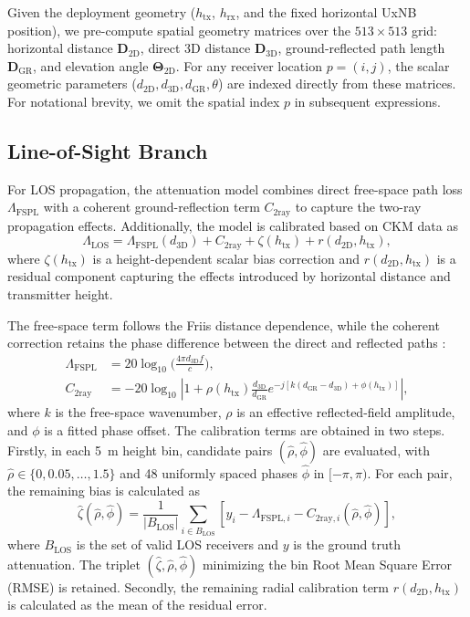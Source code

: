 \documentclass[10pt,conference,letterpaper]{IEEEtran}
\begin{document}
Given the deployment geometry ($h_{\text{tx}}$, $h_{\text{rx}}$, and the fixed horizontal UxNB position), we pre-compute spatial geometry matrices over the $513 \times 513$ grid: horizontal distance $\mathbf{D}_{\text{2D}}$, direct 3D distance $\mathbf{D}_{\text{3D}}$, ground-reflected path length $\mathbf{D}_{\text{GR}}$, and elevation angle $\mathbf{\Theta}_{\text{2D}}$. For any receiver location $p = (i, j)$, the scalar geometric parameters ($d_{\text{2D}}, d_{\text{3D}}, d_{\text{GR}}, \theta$) are indexed directly from these matrices. For notational brevity, we omit the spatial index $p$ in subsequent expressions.

\subsection{Line-of-Sight Branch}
\label{sec:los}
For LOS propagation, the attenuation model combines direct free-space path loss $\Lambda_\text{FSPL}$ with a coherent ground-reflection term $C_{\text{2ray}}$ to capture the two-ray propagation effects. Additionally, the model is calibrated based on CKM data as
\begin{equation}
\Lambda_{\text{LOS}} = \Lambda_\text{FSPL}(d_{\text{3D}}) + C_{\text{2ray}} + \zeta(h_{\text{tx}}) + r(d_{\text{2D}},h_{\text{tx}}),
\label{eq:pl_los}
\end{equation}
where $\zeta(h_{\text{tx}})$ is a height-dependent scalar bias correction and $r(d_{\text{2D}},h_{\text{tx}})$ is a residual component capturing the effects introduced by horizontal distance and transmitter height.

The free-space term follows the Friis distance dependence, while the coherent
correction retains the phase difference between the direct and reflected paths
\cite{rappaport}:
\begin{align}
\Lambda_\text{FSPL}&=20\log_{10}\Big(\frac{4\pi d_\text{3D} f}{c}\Big),\label{eq:fspl}\\
C_{\mathrm{2ray}}&=-20\log_{10}\left|1+\rho(h_{\mathrm{tx}})
\frac{d_{\mathrm{3D}}}{d_{\mathrm{GR}}}
e^{-j[k(d_{\mathrm{GR}}-d_{\mathrm{3D}})+\phi(h_{\mathrm{tx}})]}\right|,
\label{eq:tworay}
\end{align}
where $k$ is the free-space wavenumber, $\rho$ is an effective reflected-field amplitude, and $\phi$ is a fitted phase offset. The calibration terms are obtained in two steps.
Firstly, in each \SI{5}{m} height bin, candidate pairs $(\hat\rho,\hat\phi)$ are evaluated, with $\hat\rho\in\{0,0.05,\ldots,1.5\}$ and 48 uniformly spaced phases $\hat{\phi}$ in $[-\pi,\pi)$. For each pair, the remaining bias is calculated as
\begin{equation}
\hat\zeta(\hat\rho,\hat\phi)=\frac{1}{|B_\text{LOS}|}\sum_{i\in B_\text{LOS}}
\left[y_i-\Lambda_{\text{FSPL},i}-C_{\mathrm{2ray},i}(\hat\rho,\hat\phi)\right],
\label{eq:los-fit}
\end{equation}
where $B_\text{LOS}$ is the set of valid LOS receivers and $y$ is the ground truth attenuation. The triplet $(\hat\zeta,\hat\rho,\hat\phi)$ minimizing the bin Root Mean Square Error (RMSE) is retained.
Secondly, the remaining radial calibration term $r(d_{\text{2D}},h_\text{tx})$ is calculated as the mean of the residual error.
\end{document}
